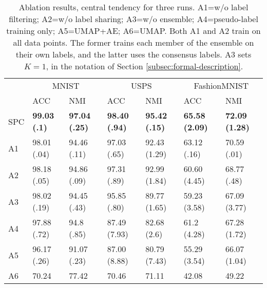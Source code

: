 \documentclass[runningheads]{llncs}
\begin{document}
\begin{table*}[!t]
\medskip 
  \centering
  \footnotesize
  \begin{tabular}{@{}lllllll@{}}
    \toprule
    & \multicolumn{2}{c}{MNIST} & \multicolumn{2}{c}{USPS} & \multicolumn{2}{c}{FashionMNIST}        \\
    \cmidrule(r){2-3}  \cmidrule(r){4-5}  \cmidrule(r){6-7}
    & ACC & NMI & ACC & NMI & ACC & NMI \\
    \midrule
    
    SPC& \textbf{99.03 (.1)} & \textbf{97.04 (.25)} & \textbf{98.40 (.94)} & \textbf{95.42 (.15)} & \textbf{65.58 (2.09)} & \textbf{72.09 (1.28)} \\ 
    
    \midrule
   
    A1 & 98.01 (.04) & 94.46 (.11) & 97.03 (.65) & 92.43 (1.29) & 63.12 (.16) & 70.59 (.01) \\
    
    A2 & 98.18 (.05) & 94.86 (.09) & 97.31 (.89) & 92.99 (1.84) & 60.60 (4.45) & 68.77 (.48) \\
    
    A3 & 98.02 (.19) & 94.45 (.43) & 95.85 (.80) & 89.77 (1.65) & 59.23 (3.58) & 67.09 (3.77) \\
    
    A4 & 97.88 (.72) & 94.8 (.85) & 87.49 (7.93) & 82.68 (2.6) & 61.2 (4.28) & 67.28 (1.72) \\
    
    A5 & 96.17 (.26) & 91.07 (.23) & 87.00 (8.88) & 80.79 (7.43) & 55.29 (3.54) & 66.07 (1.04) \\
    
    A6 & 70.24 & 77.42 & 70.46 & 71.11 & 42.08 & 49.22 \\
     
   \bottomrule
  \end{tabular}
  \vspace{2ex}
  \caption{ \footnotesize Ablation results, central tendency for three runs. A1=w/o label filtering; A2=w/o label sharing; A3=w/o ensemble; A4=pseudo-label training only; A5=UMAP+AE; A6=UMAP. Both A1 and A2 train on all data points. The former trains each member of the ensemble on their own labels, and the latter uses the consensus labels. A3 sets $K=1$, in the notation of Section \ref{subsec:formal-description}.} \label{tab:ablation-results}
 \vspace{-4ex}
\end{table*}
\end{document}
